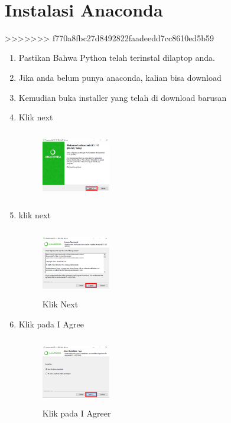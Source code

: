 \
\section{Instalasi Anaconda}
>>>>>>> f770a8fbc27d8492822faadeedd7cc8610ed5b59
\begin{enumerate}
    \item Pastikan Bahwa Python telah terinstal dilaptop anda.
    \item Jika anda belum punya anaconda, kalian bisa download
    \item Kemudian buka installer yang telah di download barusan
    \item Klik next
    \begin{figure}[H]
        \centering
        \includegraphics[width=3cm,height=3cm]{figures/1.png}
        \label{awal}
        \end{figure}

    \item klik next
    \begin{figure}[H]
        \centering
        \includegraphics[width=3cm,height=3cm]{figures/2.png}
        \caption{Klik Next}
        \label{License}
        \end{figure}

    \item Klik pada I Agree
     \begin{figure}[H]
        \centering
        \includegraphics[width=3cm,height=3cm]{figures/3.png}
        \caption{Klik pada I Agreer}
        \label{User}
        \end{figure}


\end{enumerate}
